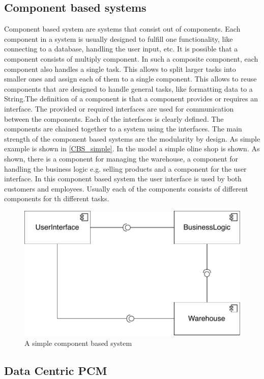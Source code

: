 \subsection{Component based systems}
Component based system are systems that consist out of components. Each component in a system is usually designed to fulfill one functionality, like connecting to a database, handling the user input, etc. It is possible that a component consists of multiply component. In such a composite component, each component also handles a single task. This allows to split larger tasks into smaller ones and assign each of them to a single component. This allows to reuse components that are designed to handle general tasks, like formatting data to a String.The definition of a component is that a component provides or requires an interface. The provided or required interfaces are used for communication between the components. Each of the interfaces is clearly defined. The components are chained together to a system using the interfaces. The main strength of the component based systems are the modularity by design. As simple example is shown in \autoref{CBS_simple}. In the model a simple oline shop is shown. As shown, there is a component for managing the warehouse, a component for handling the business logic e.g. selling products and a component for the user interface. In this component based system the  user interface is used by both customers and employees. Usually each of the components consists of different components for th different tasks. 
\begin{figure}
\includegraphics[scale=.8]{logos/SimpleCBS.pdf}
\caption{A simple component based system}
\label{CBS_simple}
\end{figure}
\subsection{Data Centric PCM}

